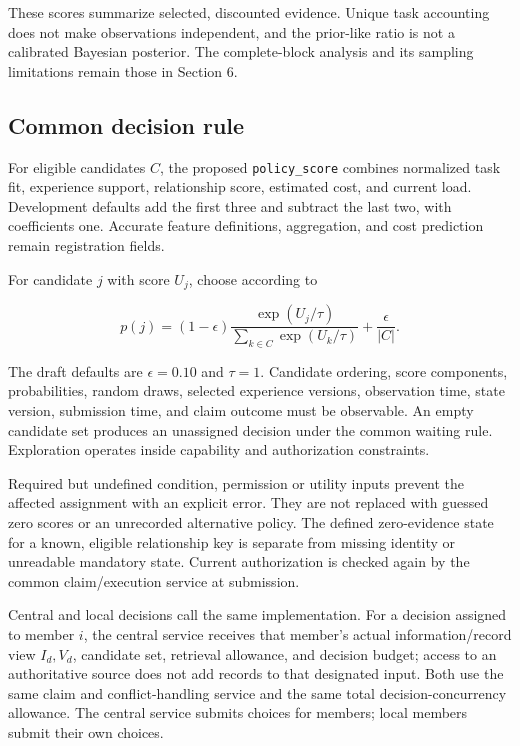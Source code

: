 \documentclass[
  english,
  11pt,
]{article}
\begin{document}
These scores summarize selected, discounted evidence. Unique task
accounting does not make observations independent, and the prior-like
ratio is not a calibrated Bayesian posterior. The complete-block
analysis and its sampling limitations remain those in Section 6.

\subsection{Common decision rule}\label{common-decision-rule}

For eligible candidates \(C\), the proposed \texttt{policy\_score}
combines normalized task fit, experience support, relationship score,
estimated cost, and current load. Development defaults add the first
three and subtract the last two, with coefficients one. Accurate feature
definitions, aggregation, and cost prediction remain registration
fields.

For candidate \(j\) with score \(U_j\), choose according to

\[
p(j)=(1-\epsilon)
\frac{\exp(U_j/\tau)}{\sum_{k\in C}\exp(U_k/\tau)}
+\frac{\epsilon}{|C|}.
\]

The draft defaults are \(\epsilon=0.10\) and \(\tau=1\). Candidate
ordering, score components, probabilities, random draws, selected
experience versions, observation time, state version, submission time,
and claim outcome must be observable. An empty candidate set produces an
unassigned decision under the common waiting rule. Exploration operates
inside capability and authorization constraints.

Required but undefined condition, permission or utility inputs prevent
the affected assignment with an explicit error. They are not replaced
with guessed zero scores or an unrecorded alternative policy. The
defined zero-evidence state for a known, eligible relationship key is
separate from missing identity or unreadable mandatory state. Current
authorization is checked again by the common claim/execution service at
submission.

Central and local decisions call the same implementation. For a decision
assigned to member \(i\), the central service receives that member's
actual information/record view \(I_d,V_d\), candidate set, retrieval
allowance, and decision budget; access to an authoritative source does
not add records to that designated input. Both use the same claim and
conflict-handling service and the same total decision-concurrency
allowance. The central service submits choices for members; local
members submit their own choices.
\end{document}
